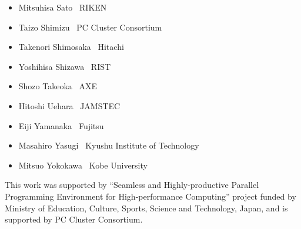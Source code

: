 \documentclass[a4paper,11pt,twoside]{report}
\begin{document}
\begin{itemize}
\item Mitsuhisa Sato     \dotfill \ RIKEN
\item Taizo Shimizu      \dotfill \ PC Cluster Consortium
\item Takenori Shimosaka \dotfill \ Hitachi
\item Yoshihisa Shizawa  \dotfill \ RIST
\item Shozo Takeoka      \dotfill \ AXE
\item Hitoshi Uehara     \dotfill \ JAMSTEC
\item Eiji Yamanaka      \dotfill \ Fujitsu
\item Masahiro Yasugi    \dotfill \ Kyushu Institute of Technology
\item Mitsuo Yokokawa    \dotfill \ Kobe University
\end{itemize}

This work was supported by ``Seamless and Highly-productive Parallel
Programming Environment for High-performance Computing'' project funded
by Ministry of Education, Culture, Sports, Science and Technology,
Japan, and is supported by PC Cluster Consortium.

\newpage
\mbox{}\newpage

\pagestyle{fancy}
\fancyhead{} %
\fancyhead[RE]{\leftmark}
\fancyhead[LO]{\rightmark}
\fancyhead[LE,RO]{\thepage}
\fancyfoot{} %
\renewcommand{\headrulewidth}{0pt}
\renewcommand{\footrulewidth}{0pt}



\cleardoublepage


\cleardoublepage






\cleardoublepage


\cleardoublepage


\cleardoublepage


\cleardoublepage


\end{document}
